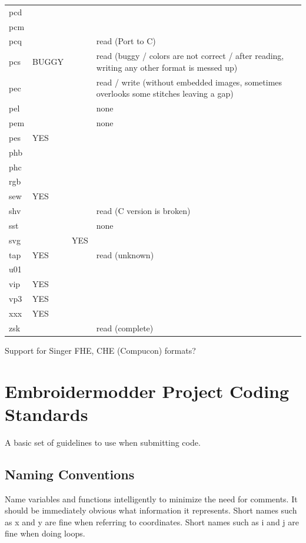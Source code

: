 \documentclass[a4paper, 11pt]{report}
\begin{document}
\begin{longtable}{l l l p{8cm}}
pcd    &       &       &  \\
pcm    &       &       & \\
pcq    &       &       & read (Port to C)\\
pcs    & BUGGY &       & read (buggy / colors are not correct / after reading, writing any other format is messed up)\\
pec    &       &       & read / write (without embedded images, sometimes overlooks some stitches leaving a gap)\\
pel    &       &       & none\\
pem    &       &       & none\\
pes    & YES   &       & \\
phb    &       &       & \\
phc    &       &       & \\
rgb    &       &       & \\
sew    & YES   &       & \\
shv    &       &       & read (C version is broken)\\
sst    &       &       & none\\
svg    &       & YES   & \\
tap    & YES   &       & read (unknown)\\
u01    &       &       & \\
vip    & YES   &       & \\
vp3    & YES   &       & \\
xxx    & YES   &       & \\
zsk    &       &       & read (complete)
\end{longtable}

Support for Singer FHE, CHE (Compucon) formats?

\section{Embroidermodder Project Coding Standards}

A basic set of guidelines to use when submitting code.

\subsection{Naming Conventions}

Name variables and functions intelligently to minimize the need for comments.
It should be immediately obvious what information it represents.
Short names such as x and y are fine when referring to coordinates.
Short names such as i and j are fine when doing loops.
\end{document}
